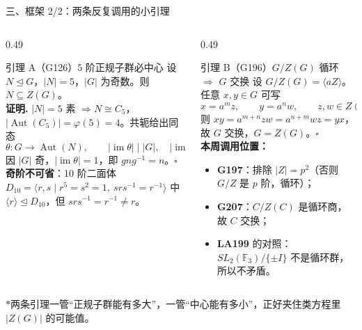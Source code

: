 \documentclass[aspectratio=169,10pt,fontset=none]{ctexbeamer}
\newcommand{\ex}[1]{\textcolor{accent}{\footnotesize\bfseries #1}}
\newcommand{\key}[1]{\textcolor{ink}{\bfseries #1}}
\newcommand{\starpt}{\textcolor{accent}{\bfseries$\ast$}}
\begin{document}
\begin{frame}[t]{三、框架 2/2：两条反复调用的小引理}
  \label{sec:frame2}
  \begin{columns}[T,onlytextwidth]
    \begin{column}{0.49\textwidth}
      \begin{alertblock}{\footnotesize 引理 A（G126）$5$ 阶正规子群必中心}
        \scriptsize
        设 $N\trianglelefteq G$，$|N|=5$，$|G|$ 为奇数。则 $N\subseteq Z(G)$。\\[2pt]
        \textbf{证明.} $|N|=5$ 素 $\Rightarrow N\cong C_5$，$|\operatorname{Aut}(C_5)|=\varphi(5)=4$。共轭给出同态
        \[ \theta:G\to\operatorname{Aut}(N),\qquad |\operatorname{im}\theta|\mid|G|,\quad |\operatorname{im}\theta|\mid4. \]
        因 $|G|$ 奇，$|\operatorname{im}\theta|=1$，即 $gng^{-1}=n$。$\square$\\[2pt]
        \key{奇阶不可省}：10 阶二面体 $D_{10}=\langle r,s\mid r^5=s^2=1,\ srs^{-1}=r^{-1}\rangle$ 中 $\langle r\rangle\trianglelefteq D_{10}$，但 $srs^{-1}=r^{-1}\ne r$。
      \end{alertblock}
    \end{column}
    \begin{column}{0.49\textwidth}
      \begin{alertblock}{\footnotesize 引理 B（G196）$G/Z(G)$ 循环 $\Rightarrow$ $G$ 交换}
        \scriptsize
        设 $G/Z(G)=\langle aZ\rangle$。任意 $x,y\in G$ 可写
        \[ x=a^m z,\qquad y=a^n w,\qquad z,w\in Z(G). \]
        则 $xy=a^{m+n}zw=a^{n+m}wz=yx$，故 $G$ 交换，$G=Z(G)$。$\square$\\[3pt]
        \key{本周调用位置：}
        \begin{itemize}\setlength{\itemsep}{0pt}
          \item \ex{G197}：排除 $|Z|=p^2$（否则 $G/Z$ 是 $p$ 阶，循环）；
          \item \ex{G207}：$C/Z(C)$ 是循环商，故 $C$ 交换；
          \item \ex{LA199} 的对照：$SL_2(\mathbb F_3)/\{\pm I\}$ 不是循环群，所以不矛盾。
        \end{itemize}
      \end{alertblock}
    \end{column}
  \end{columns}
  \vspace{0.1em}
  {\scriptsize\color{ink!80} \starpt 两条引理一管“正规子群能有多大”，一管“中心能有多小”，正好夹住类方程里 $|Z(G)|$ 的可能值。}
\end{frame}
\end{document}
